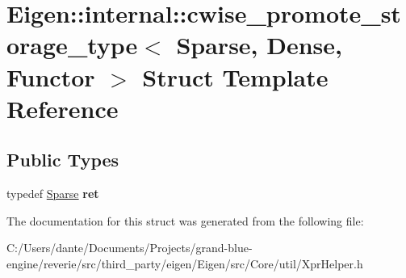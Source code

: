 \hypertarget{struct_eigen_1_1internal_1_1cwise__promote__storage__type_3_01_sparse_00_01_dense_00_01_functor_01_4}{}\section{Eigen\+::internal\+::cwise\+\_\+promote\+\_\+storage\+\_\+type$<$ Sparse, Dense, Functor $>$ Struct Template Reference}
\label{struct_eigen_1_1internal_1_1cwise__promote__storage__type_3_01_sparse_00_01_dense_00_01_functor_01_4}
\subsection*{Public Types}
\begin{DoxyCompactItemize}
\item 
\mbox{\label{struct_eigen_1_1internal_1_1cwise__promote__storage__type_3_01_sparse_00_01_dense_00_01_functor_01_4_aeecffafd07b91b825f576de00a1aa126}} 
typedef \mbox{\hyperlink{struct_eigen_1_1_sparse}{Sparse}} {\bfseries ret}
\end{DoxyCompactItemize}


The documentation for this struct was generated from the following file\+:\begin{DoxyCompactItemize}
\item 
C\+:/\+Users/dante/\+Documents/\+Projects/grand-\/blue-\/engine/reverie/src/third\+\_\+party/eigen/\+Eigen/src/\+Core/util/Xpr\+Helper.\+h\end{DoxyCompactItemize}
